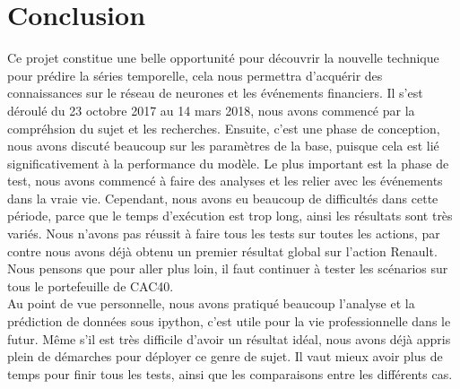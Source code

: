 
\section{Conclusion}

Ce projet constitue une belle opportunité pour découvrir la nouvelle technique pour prédire la séries temporelle, cela nous permettra d’acquérir des connaissances sur le réseau de neurones et les événements financiers. Il s’est déroulé du 23 octobre 2017 au 14 mars 2018, nous avons commencé par la compréhsion du sujet et les recherches. Ensuite, c'est une phase de conception, nous avons discuté beaucoup sur les paramètres de la base, puisque cela est lié significativement à la performance du modèle. Le plus important est la phase de test, nous avons commencé à faire des analyses et les relier avec les événements dans la vraie vie. Cependant, nous avons eu beaucoup de difficultés dans cette période, parce que le temps d'exécution est trop long, ainsi les résultats sont très variés. Nous n'avons pas réussit à faire tous les tests sur toutes les actions, par contre nous avons déjà obtenu un premier résultat global sur l'action Renault. Nous pensons que pour aller plus loin, il faut continuer à tester les scénarios sur tous le portefeuille de CAC40. \\

Au point de vue personnelle, nous avons pratiqué beaucoup l'analyse et la prédiction de données sous ipython, c'est utile pour la vie professionnelle dans le futur. Même s'il est très difficile d'avoir un résultat idéal, nous avons déjà appris plein de démarches pour déployer ce genre de sujet. Il vaut mieux avoir plus de temps pour finir tous les tests, ainsi que les comparaisons entre les différents cas. 